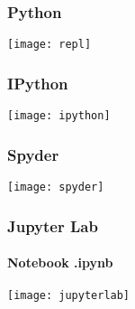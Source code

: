 \documentclass[12pt]{beamer}
\begin{document}
\begin{frame}
\frametitle{Python}
\centering
	\texttt{[image: repl]}
\end{frame}
\begin{frame}
\frametitle{IPython}
\centering
	\texttt{[image: ipython]}
\end{frame}
\begin{frame}
\frametitle{Spyder}
\centering
	\texttt{[image: spyder]}
\end{frame}
\begin{frame}
\frametitle{Jupyter Lab}
\framesubtitle{Notebook .ipynb}
\centering
	\texttt{[image: jupyterlab]}
\end{frame}
\end{document}
